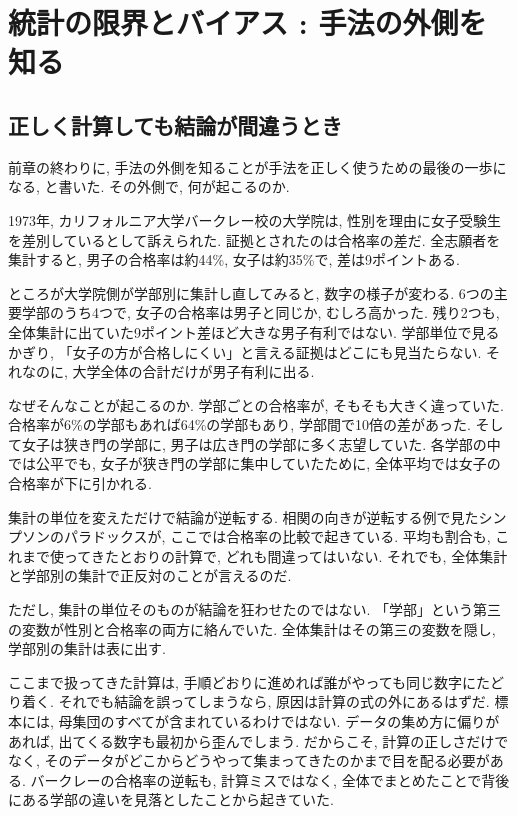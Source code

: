 ﻿\section{統計の限界とバイアス : 手法の外側を知る}

\subsection{正しく計算しても結論が間違うとき}

前章の終わりに, 手法の外側を知ることが手法を正しく使うための最後の一歩になる, と書いた.
その外側で, 何が起こるのか.

1973年, カリフォルニア大学バークレー校の大学院は, 性別を理由に女子受験生を差別しているとして訴えられた.
証拠とされたのは合格率の差だ. 全志願者を集計すると, 男子の合格率は約44\%, 女子は約35\%で, 差は9ポイントある.

ところが大学院側が学部別に集計し直してみると, 数字の様子が変わる.
6つの主要学部のうち4つで, 女子の合格率は男子と同じか, むしろ高かった.
残り2つも, 全体集計に出ていた9ポイント差ほど大きな男子有利ではない.
学部単位で見るかぎり, 「女子の方が合格しにくい」と言える証拠はどこにも見当たらない.
それなのに, 大学全体の合計だけが男子有利に出る.

なぜそんなことが起こるのか.
学部ごとの合格率が, そもそも大きく違っていた.
合格率が6\%の学部もあれば64\%の学部もあり, 学部間で10倍の差があった.
そして女子は狭き門の学部に, 男子は広き門の学部に多く志望していた.
各学部の中では公平でも, 女子が狭き門の学部に集中していたために, 全体平均では女子の合格率が下に引かれる.

集計の単位を変えただけで結論が逆転する. 相関の向きが逆転する例で見たシンプソンのパラドックスが, ここでは合格率の比較で起きている.
平均も割合も, これまで使ってきたとおりの計算で, どれも間違ってはいない.
それでも, 全体集計と学部別の集計で正反対のことが言えるのだ.

ただし, 集計の単位そのものが結論を狂わせたのではない.
「学部」という第三の変数が性別と合格率の両方に絡んでいた.
全体集計はその第三の変数を隠し, 学部別の集計は表に出す.

ここまで扱ってきた計算は, 手順どおりに進めれば誰がやっても同じ数字にたどり着く. それでも結論を誤ってしまうなら, 原因は計算の式の外にあるはずだ.
標本には, 母集団のすべてが含まれているわけではない. データの集め方に偏りがあれば, 出てくる数字も最初から歪んでしまう.
だからこそ, 計算の正しさだけでなく, そのデータがどこからどうやって集まってきたのかまで目を配る必要がある.
バークレーの合格率の逆転も, 計算ミスではなく, 全体でまとめたことで背後にある学部の違いを見落としたことから起きていた.


